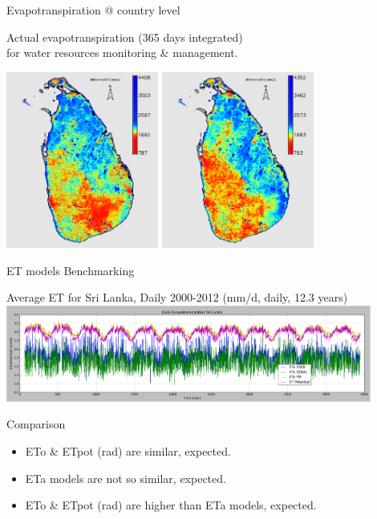 \documentclass[xcolor=dvipsnames,beamer]{beamer} %
\begin{document}
\begin{frame}[fragile]{Evapotranspiration @ country level}

Actual evapotranspiration (365 days integrated)\\ 
for water resources monitoring \& management.\\

\begin{center}
 \includegraphics[width=5cm]{slet2005}
 \hspace{10mm}
 \includegraphics[width=5cm]{slet2010}
\end{center}
\end{frame}

\begin{frame}[fragile]{ET models Benchmarking}

\begin{center}
 Average ET for Sri Lanka, Daily 2000-2012 (mm/d, daily, 12.3 years)
 \includegraphics[width=12cm]{sltemporaletb}
\end{center}

\begin{block}{Comparison}
\begin{itemize}
 \item ETo \& ETpot (rad) are similar, expected.
 \item ETa models are not so similar, expected.
 \item ETo \& ETpot (rad) are higher than ETa models, expected.
\end{itemize}

\end{block}
\end{frame}
\end{document}
